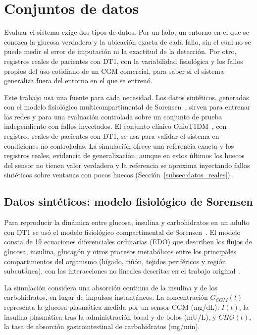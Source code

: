 \documentclass{report}
\begin{document}
\section{Conjuntos de datos} 
\label{sec:datasets}
Evaluar el sistema exige dos tipos de datos. Por un lado, un entorno en el que se conozca la glucosa verdadera y la ubicación exacta de cada fallo, sin el cual no se puede medir el error de imputación ni la exactitud de la detección. Por otro, registros reales de pacientes con DT1, con la variabilidad fisiológica y los fallos propios del uso cotidiano de un CGM comercial, para saber si el sistema generaliza fuera del entorno en el que se entrenó.

Este trabajo usa una fuente para cada necesidad. Los datos sintéticos, generados con el modelo fisiológico multicompartimental de Sorensen~\cite{ruiz2018sorensen}, sirven para entrenar las redes y para una evaluación controlada sobre un conjunto de prueba independiente con fallos inyectados. El conjunto clínico OhioT1DM~\cite{marling2020ohiot1dm}, con registros reales de pacientes con DT1, se usa para validar el sistema en condiciones no controladas. La simulación ofrece una referencia exacta y los registros reales, evidencia de generalización, aunque en estos últimos los huecos del sensor no tienen valor verdadero y la referencia se aproxima inyectando fallos sintéticos sobre ventanas con pocos huecos (Sección~\ref{subsec:datos_reales}).

\subsection{Datos sintéticos: modelo fisiológico de Sorensen}
\label{subsec:datos_sinteticos}
Para reproducir la dinámica entre glucosa, insulina y carbohidratos en un adulto con DT1 se usó el modelo fisiológico compartimental de Sorensen~\cite{ruiz2018sorensen}. El modelo consta de 19 ecuaciones diferenciales ordinarias (EDO) que describen los flujos de glucosa, insulina, glucagón y otros procesos metabólicos entre los principales compartimentos del organismo (hígado, riñón, tejidos periféricos y región subcutánea), con las interacciones no lineales descritas en el trabajo original~\cite{sorensen1985physiologic}.

La simulación considera una absorción continua de la insulina y de los carbohidratos, en lugar de impulsos instantáneos. La concentración $G_{CGM}(t)$ representa la glucosa plasmática medida por un sensor CGM (mg/dL); $I(t)$, la insulina plasmática tras la administración basal y de bolos (mU/L), y $\mathit{CHO}(t)$, la tasa de absorción gastrointestinal de carbohidratos (mg/min).
\end{document}
